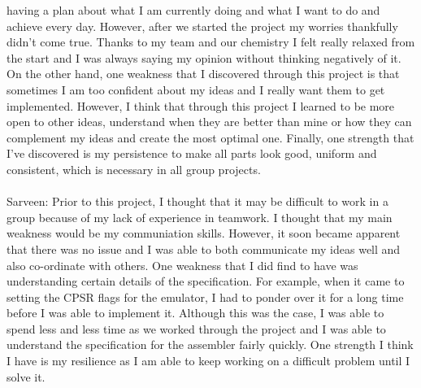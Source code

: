 \documentclass[a4paper]{article}
\begin{document}
having a plan about what I am currently doing and what I want to do and achieve every day. However, after we started the 
project my worries thankfully didn't come true. Thanks to my team and our chemistry I felt really relaxed
from the start and I was always saying my opinion without thinking negatively of it. On the other hand, one weakness
that I discovered through this project is that sometimes I am too confident about my ideas and I really want them to get implemented. 
However, I think that through this project I learned to be more open to other ideas, understand when they are better than mine or how they
can complement my ideas and create the most optimal one. Finally, one strength that I've discovered is my persistence to make all parts
look good, uniform and consistent, which is necessary in all group projects.
\\ \\
Sarveen: Prior to this project, I thought that it may be difficult to work in a group because of my lack of experience in teamwork.
I thought that my main weakness would be my communiation skills. However, it soon became apparent that there was no issue and I was able
to both communicate my ideas well and also co-ordinate with others. One weakness that I did find to have was understanding certain
details of the specification. For example, when it came to setting the CPSR flags for the emulator, I had to ponder over it for a long
time before I was able to implement it. Although this was the case, I was able to spend less and less time as we worked through the 
project and I was able to understand the specification for the assembler fairly quickly. One strength I think I have is my resilience as 
I am able to keep working on a difficult problem until I solve it. 
\end{document}
